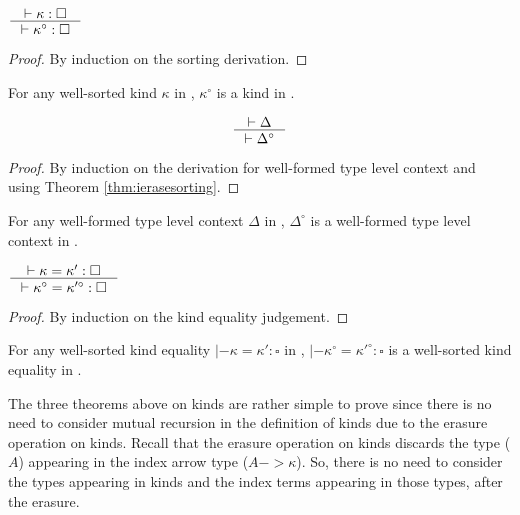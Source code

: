 \begin{theorem}
\label{thm:ierasesorting}
	$\inference{|- \kappa : \square}{|- \kappa^\circ : \square}$
\end{theorem}
\begin{proof}
	By induction on the sorting derivation.
\end{proof}
\begin{remark}
For any well-sorted kind $\kappa$ in \Fi,
$\kappa^\circ$ is a kind in \Fw.
\end{remark}

\begin{theorem}
\label{thm:ierasetyctx}
\[ \inference{|- \Delta}{|- \Delta^\circ} \]
\end{theorem}
\begin{proof}
	By induction on the derivation for well-formed type level context
	and using Theorem \ref{thm:ierasesorting}.
\end{proof}
\begin{remark}
For any well-formed type level context $\Delta$ in \Fi,
$\Delta^\circ$ is a well-formed type level context in \Fw.
\end{remark}

\begin{theorem}\label{thm:ierasekindeq}
$ \inference{|- \kappa=\kappa':\square}
	{|- \kappa^\circ=\kappa'^\circ:\square}
$
\end{theorem}
\begin{proof}
	By induction on the kind equality judgement.
\end{proof}
\begin{remark}
For any well-sorted kind equality $|- \kappa=\kappa':\square$ in \Fi,
$|- \kappa^\circ=\kappa'^\circ:\square$ is a well-sorted kind equality in \Fw.
\end{remark}

The three theorems above on kinds are rather simple to prove since there is
no need to consider mutual recursion in the definition of kinds due to
the erasure operation on kinds. Recall that the erasure operation on kinds
discards the type ($A$) appearing in the index arrow type ($A -> \kappa$).
So, there is no need to consider the types appearing in kinds
and the index terms appearing in those types, after the erasure.\\

